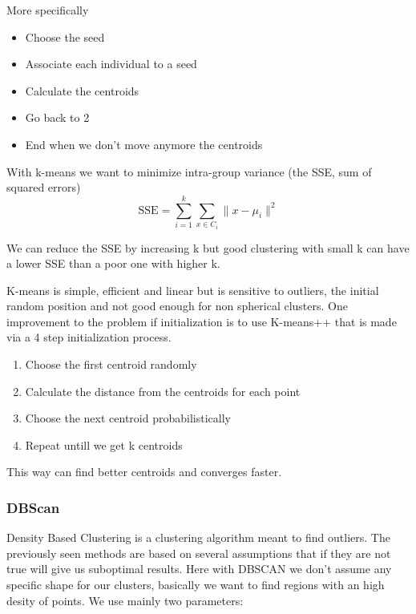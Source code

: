 More specifically

\begin{itemize}
    \item Choose the seed
    \item Associate each individual to a seed
    \item Calculate the centroids
    \item Go back to 2
    \item End when we don't move anymore the centroids
\end{itemize}

With k-means we want to minimize intra-group variance (the SSE, sum of squared errors)
\begin{equation}
\text{SSE} = \sum_{i=1}^{k} \sum_{x \in C_i} \| x - \mu_i \|^2
\end{equation}

We can reduce the SSE by increasing k but good clustering with small k can have a lower SSE than a poor one with higher k.

\vspace{10pt} 

K-means is simple, efficient and linear but is sensitive to outliers, the initial random position and not good enough for non spherical clusters.
One improvement to the problem if initialization is to use K-means++ that is made via a 4 step initialization process.
\begin{enumerate}
    \item Choose the first centroid randomly
    \item Calculate the distance from the centroids for each point
    \item Choose the next centroid probabilistically
    \item Repeat untill we get k centroids
\end{enumerate}

This way can find better centroids and converges faster.

\vspace{10pt}


\subsubsection{DBScan}

Density Based Clustering is a clustering algorithm meant to find outliers. 
The previously seen methods are based on several assumptions that if they are not true will give us suboptimal results. Here with DBSCAN we don't assume any specific shape for our clusters, basically we want to find regions with an high desity of points. We use mainly two parameters:

